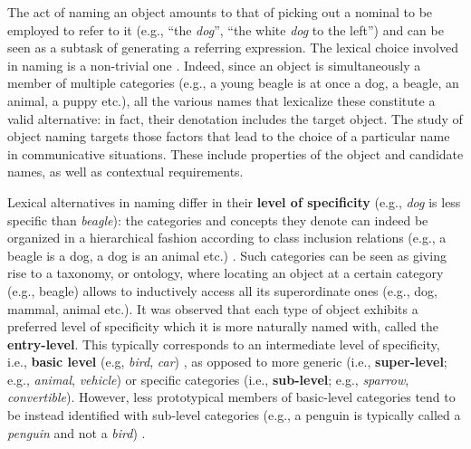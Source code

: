 The act of naming an object amounts to that of picking out a nominal to be employed to refer to it (e.g., ``the \textit{dog}'', ``the white \textit{dog} to the left'') and can be seen as a subtask of generating a referring expression. The lexical choice involved in naming is a non-trivial one \cite{brown1958shall}. Indeed, since an object is simultaneously a member of multiple categories (e.g., a young beagle is at once a dog, a beagle, an animal, a puppy etc.), all the various names that lexicalize these constitute a valid alternative: in fact, their denotation includes the target object. The study of object naming targets those factors that lead to the choice of a particular name in communicative situations. These include properties of the object and candidate names, as well as contextual requirements.

Lexical alternatives in naming differ in their \textbf{level of specificity} (e.g., \textit{dog} is less specific than \textit{beagle})\cite{cruse1977pragmatics}: the categories and concepts they denote can indeed be organized in a hierarchical fashion according to class inclusion relations (e.g., a beagle is a dog, a dog is an animal etc.)  \cite{murphy2004big}. Such categories can be seen as giving rise to a taxonomy, or ontology, where locating an object at a certain category (e.g., beagle) allows to inductively access all its superordinate ones (e.g., dog, mammal, animal etc.).
It was observed that each type of object exhibits a preferred level of specificity which it is more naturally named with, called the \textbf{entry-level}. This typically corresponds to an intermediate level of specificity, i.e., \textbf{basic level} (e.g, \textit{bird}, \textit{car}) \cite{rosch1976basic}, as opposed to more generic (i.e., \textbf{super-level}; e.g., \textit{animal}, \textit{vehicle}) or specific categories (i.e., \textbf{sub-level}; e.g., \textit{sparrow}, \textit{convertible}). However, less prototypical members of basic-level categories tend to be instead identified with sub-level categories (e.g., a penguin is typically called a \textit{penguin} and not a \textit{bird}) \cite{jolicoeur1984pictures}. 


